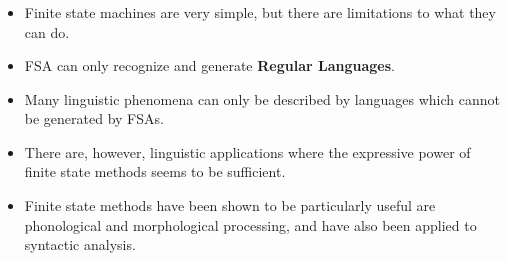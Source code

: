 \begin{frame}

	\frametitle{\insertsection}
	\framesubtitle{\insertsubsection}
	
	\begin{itemize}
		\item Finite state machines are very simple, but there are limitations to what they can do.
		\item FSA can only recognize and generate \textbf{Regular Languages}.
		\item Many linguistic phenomena can only be described by languages which cannot be generated by FSAs.
		\item There are, however, linguistic applications where the expressive power of finite state methods seems to be sufficient.
		\item Finite state methods have been shown to be particularly useful are phonological and morphological processing, and have also been applied to syntactic analysis.
	\end{itemize}

\end{frame}